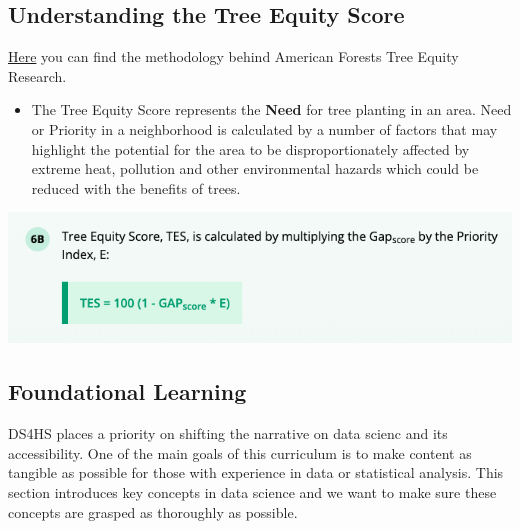 \documentclass[
  letterpaper,
  DIV=11,
  numbers=noendperiod,
  oneside]{scrartcl}
\providecommand{\tightlist}{%
  \setlength{\itemsep}{0pt}\setlength{\parskip}{0pt}}\usepackage{longtable,booktabs,array}
\begin{document}
\hypertarget{understanding-the-tree-equity-score}{%
\subsection{Understanding the Tree Equity
Score}\label{understanding-the-tree-equity-score}}

\href{https://www.treeequityscore.org/methodology}{Here} you can find
the methodology behind American Forests Tree Equity Research.

\begin{itemize}
\tightlist
\item
  The Tree Equity Score represents the \textbf{Need} for tree planting
  in an area. Need or Priority in a neighborhood is calculated by a
  number of factors that may highlight the potential for the area to be
  disproportionately affected by extreme heat, pollution and other
  environmental hazards which could be reduced with the benefits of
  trees.
\end{itemize}

\begin{marginfigure}

{\centering \includegraphics{TESCalc.png}

}

\end{marginfigure}

\hypertarget{foundational-learning}{%
\subsection{Foundational Learning}\label{foundational-learning}}

DS4HS places a priority on shifting the narrative on data scienc and its
accessibility. One of the main goals of this curriculum is to make
content as tangible as possible for those with experience in data or
statistical analysis. This section introduces key concepts in data
science and we want to make sure these concepts are grasped as
thoroughly as possible.
\end{document}
